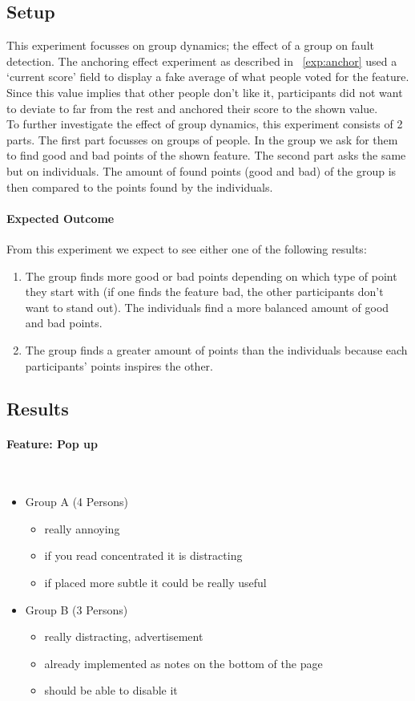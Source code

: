 \documentclass[main.tex]{subfiles}
\begin{document}
\subsection{Setup}
This experiment focusses on group dynamics; the effect of a group on fault detection. The anchoring effect experiment as described in ~\ref{exp:anchor} used a `current score' field to display a fake average of what people voted for the feature. Since this value implies that other people don't like it, participants did not want to deviate to far from the rest and anchored their score to the shown value. \\
To further investigate the effect of group dynamics, this experiment consists of 2 parts. The first part focusses on groups of people. In the group we ask for them to find good and bad points of the shown feature. The second part asks the same but on individuals. The amount of found points (good and bad) of the group is then compared to the points found by the individuals.

\paragraph{Expected Outcome}
From this experiment we expect to see either one of the following results:
\begin{enumerate}
\item The group finds more good or bad points depending on which type of point they start with (if one finds the feature bad, the other participants don't want to stand out). The individuals find a more balanced amount of good and bad points.
\item The group finds a greater amount of points than the individuals because each participants' points inspires the other.
\end{enumerate}

\subsection{Results}
\paragraph{Feature: Pop up}~
\begin{itemize}
	\item Group A (4 Persons)
		\begin{itemize}
			\item really annoying
			\item if you read concentrated it is distracting
			\item  if placed more subtle it could be really useful
		\end{itemize}
	\item Group B (3 Persons)
		\begin{itemize}
			\item really distracting, advertisement
			\item already implemented as notes on the bottom of the page
			\item  should be able to disable it
		\end{itemize}
\end{itemize}
\end{document}
